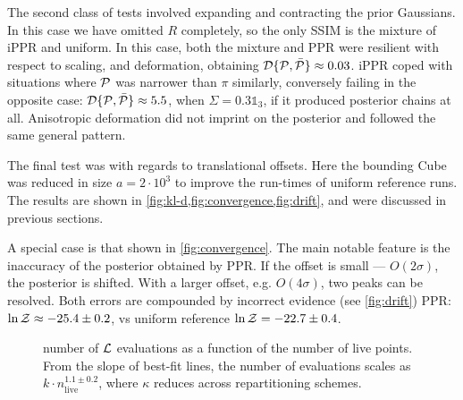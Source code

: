 \documentclass[usenatbib]{mnras}
\begin{document}
The second class of tests involved expanding and contracting the prior
Gaussians. In this case we have omitted \(R\) completely, so the only
SSIM is the mixture of iPPR and uniform. In this case, both the
mixture and PPR were resilient with respect to scaling, and
deformation, obtaining
${\cal D}\{ {\cal P}, \bar{\cal P}\} \approx 0.03$. iPPR coped with
situations where ${\cal P}$ was narrower than $\pi$ similarly,
conversely failing in the opposite case:
${\cal D}\{ {\cal P}, \bar{\cal P}\} \approx 5.5$, when
$\Sigma = 0.3 \mathds{1}_{3}$, if it produced posterior chains at
all. Anisotropic deformation did not imprint on the posterior and
followed the same general pattern.

The final test was with regards to translational offsets. Here the
bounding Cube was reduced in size \(a = 2\cdot 10^{3}\) to improve the
run-times of uniform reference runs. The results are shown in
\cref{fig:kl-d,fig:convergence,fig:drift}, and were discussed in
previous sections.

A special case is that shown in \cref{fig:convergence}. The main
notable feature is the inaccuracy of the posterior obtained by PPR. If
the offset is small --- \(O(2\sigma)\), the posterior is shifted. With
a larger offset, e.g. \(O(4\sigma)\), two peaks can be resolved.  Both
errors are compounded by incorrect evidence (see \cref{fig:drift})
PPR: \(\ln {\cal Z}\approx -25.4 \pm 0.2\), vs uniform reference
\(\ln {\cal Z} = -22.7 \pm 0.4\).



\begin{figure}
  
  \caption{number of ${\cal L}$ evaluations as a function of the
    number of live points. From the slope of best-fit lines, the
    number of evaluations scales as $k\cdot n_\text{live}^{1.1 \pm 0.2}$,
    where $\kappa$ reduces across repartitioning
    schemes. \label{fig:benchmark}}
\end{figure}
\end{document}
